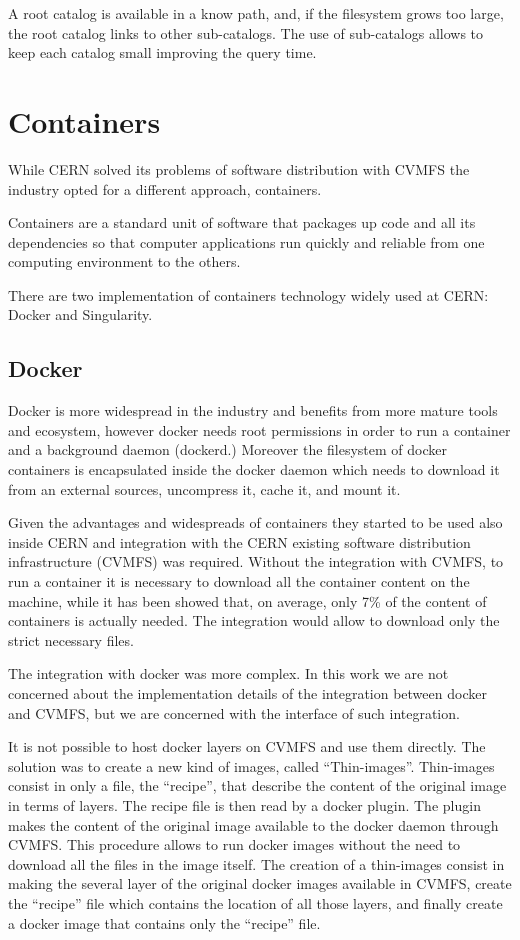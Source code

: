 A root catalog is available in a know path, and, if the filesystem grows too
large, the root catalog links to other sub-catalogs. The use of sub-catalogs
allows to keep each catalog small improving the query time.

\section{Containers}

While CERN solved its problems of software distribution with CVMFS the industry
opted for a different approach, containers.

Containers are a standard unit of software that packages up code and all its
dependencies so that computer applications run quickly and reliable from one
computing environment to the others.

There are two implementation of containers technology widely used at CERN:
Docker and Singularity.

\subsection{Docker}
\label{subsec:docker-thin-images}

Docker is more widespread in the industry and benefits from more mature tools
and ecosystem, however docker needs root permissions in order to run a
container and a background daemon (dockerd.) Moreover the filesystem of docker
containers is encapsulated inside the docker daemon which needs to download it
from an external sources, uncompress it, cache it, and mount it. 

Given the advantages and widespreads of containers they started to be used also
inside CERN and integration with the CERN existing software distribution
infrastructure (CVMFS) was required.  Without the integration with CVMFS, to
run a container it is necessary to download all the container content on the
machine, while it has been showed that, on average, only 7\% of the content of
containers is actually needed.  The integration would allow to download only
the strict necessary files.

The integration with docker was more complex. In this work we are not concerned
about the implementation details of the integration between docker and CVMFS,
but we are concerned with the interface of such integration.

It is not possible to host docker layers on CVMFS and use them directly. The
solution was to create a new kind of images, called “Thin-images”.  Thin-images
consist in only a file, the “recipe”, that describe the content of the original
image in terms of layers.  The recipe file is then read by a docker plugin. The
plugin makes the content of the original image available to the docker daemon
through CVMFS. This procedure allows to run docker images without the need to
download all the files in the image itself.  The creation of a thin-images
consist in making the several layer of the original docker images available in
CVMFS, create the “recipe” file which contains the location of all those
layers, and finally create a docker image that contains only the “recipe” file.

